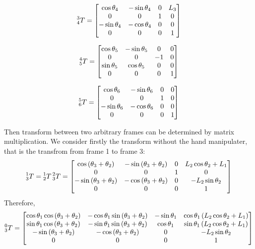 \documentclass{article}
\begin{document}
\[
    \prescript{3}{4}{T} =
    \begin{bmatrix}
        \cos \theta_4 & - \sin \theta_4 & 0 & L_3 \\
        0 & 0 & 1 & 0 \\
        -\sin \theta_4 & - \cos \theta_4 & 0 & 0 \\
        0 & 0 & 0 & 1
    \end{bmatrix}
\]

\[
    \prescript{4}{5}{T} =
    \begin{bmatrix}
        \cos \theta_5 & - \sin \theta_5 & 0 & 0 \\
        0 & 0 & -1 & 0 \\
        \sin \theta_5 & \cos \theta_5 & 0 & 0 \\
        0 & 0 & 0 & 1
    \end{bmatrix}
\]

\[
    \prescript{5}{6}{T} =
    \begin{bmatrix}
        \cos \theta_6 & - \sin \theta_6 & 0 & 0 \\
        0 & 0 & 1 & 0 \\
        -\sin \theta_6 & - \cos \theta_6 & 0 & 0 \\
        0 & 0 & 0 & 1
    \end{bmatrix}
\]

Then transform between two arbitrary frames can be determined by matrix multiplication.
We consider firstly the transform without the hand manipulater, that is the transfrom from frame 1 to frame 3:
\[
    \prescript{1}{3}{T} = \prescript{1}{2}{T} \prescript{2}{3}{T} =
    \begin{bmatrix}
        \cos{\left( {{\theta }_3}+{{\theta }_2}\right) } & -\sin{\left( {{\theta }_3}+{{\theta }_2}\right) } & 0 & {L_2} \cos{ {{\theta }_2} }+{L_1}\\
        0 & 0 & 1 & 0\\
        -\sin{\left( {{\theta }_3}+{{\theta }_2}\right) } & -\cos{\left( {{\theta }_3}+{{\theta }_2}\right) } & 0 & - {L_2} \sin{ {{\theta }_2} } \\
        0 & 0 & 0 & 1
    \end{bmatrix}
\]
Therefore,
\[
    \prescript{0}{3}{T} =
    \begin{bmatrix}
        \cos \theta_1 \cos{\left( {{\theta }_3}+{{\theta }_2}\right) } & - \cos \theta_1 \sin{\left( {{\theta }_3}+{{\theta }_2}\right) }  & -\sin \theta_1 & \cos \theta_1 \left( {L_2} \cos\theta_2+{L_1}\right) \\
            \sin \theta_1 \cos{\left( {{\theta }_3}+{{\theta }_2}\right) } & - \sin \theta_1 \sin{\left( {{\theta }_3}+{{\theta }_2}\right) }  & \cos \theta_1 & \sin \theta_1 \left( {L_2} \cos\theta_2+{L_1}\right) \\
            -\sin{\left( {{\theta }_3}+{{\theta }_2}\right) } & -\cos{\left( {{\theta }_3}+{{\theta }_2}\right) } & 0 & - {L_2} \sin \theta_2 \\
            0 & 0 & 0 & 1
    \end{bmatrix}
\]
\end{document}
